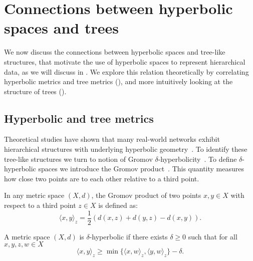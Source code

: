 

\section{Connections between hyperbolic spaces and trees}
We now discuss the connections between hyperbolic spaces and tree-like structures, that motivate the use of hyperbolic spaces to represent hierarchical data, as we will discuss in . We explore this relation theoretically by correlating hyperbolic metrics and tree metrics (), and more intuitively looking at the structure of trees ().

\subsection{Hyperbolic and tree metrics}\label{sec:hyperbolicTreeMetrics}
Theoretical studies have shown that many real-world networks exhibit hierarchical structures with underlying hyperbolic geometry~\cite{Krioukov2010HyperbolicGeometryComplexNetworks}\cite{Papadopoulos2012popularityVSSimilarityGrowingNetworks}. To identify these tree-like structures we turn to notion of Gromov $\delta$-hyperbolicity~\cite{gromov1987hyperbolic}\cite{adcock2013tree}\cite{chen2013hyperbolicity}. To define $\delta$-hyperbolic spaces we introduce the Gromov product~\cite{gromov1987hyperbolic}. This quantity measures how close two points are to each other relative to a third point.  

\begin{definition}
    In any metric space $(X,d)$, the Gromov product of two points $x,y\in X$ with respect to a third point $z\in X$ is defined as:
    \begin{equation*}
        \langle x,y \rangle_z = \frac{1}{2}\left(d(x,z) + d(y,z) - d(x,y)\right).
    \end{equation*}
\end{definition}

\begin{definition}
    A metric space $(X,d)$ is $\delta$-hyperbolic if there exists $\delta\geq0$ such that for all $x,y,z,w\in X$
    \begin{equation*}
        \langle x,y\rangle_z \geq \min\{\langle x,w\rangle_z, \langle y, w\rangle_z\} - \delta.
    \end{equation*}
\end{definition}

